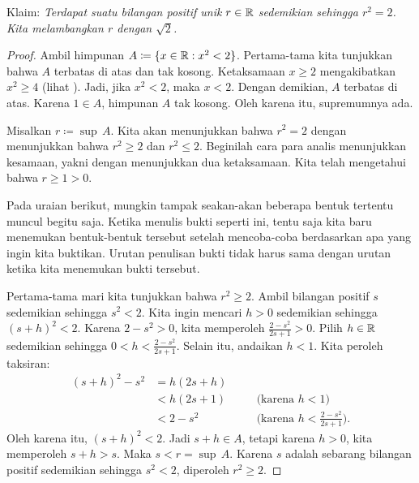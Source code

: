 \begin{example} \label{example:sqrt2}
Klaim: \emph{Terdapat suatu bilangan positif unik
$r \in {\mathbb{R}}$ sedemikian sehingga $r^2 = 2$.  Kita melambangkan $r$ dengan $\sqrt{2}$.}

\begin{proof}
Ambil himpunan
$A \coloneqq \{ x \in {\mathbb{R}} : x^2 < 2 \}$.  Pertama-tama kita tunjukkan bahwa $A$ terbatas di atas dan
tak kosong.  Ketaksamaan $x \geq 2$ mengakibatkan $x^2 \geq 4$
(lihat ).
Jadi, jika $x^2 < 2$, maka $x < 2$.  Dengan demikian, $A$ terbatas di atas.
Karena $1 \in A$, himpunan $A$ tak kosong.  Oleh karena itu, supremumnya ada.

Misalkan $r \coloneqq \sup\, A$.  Kita akan menunjukkan bahwa $r^2 = 2$ dengan menunjukkan
bahwa $r^2 \geq 2$ dan $r^2 \leq 2$.  Beginilah cara para analis menunjukkan
kesamaan, yakni dengan menunjukkan dua ketaksamaan.
Kita telah mengetahui bahwa $r \geq 1 > 0$.

Pada uraian berikut, mungkin tampak seakan-akan beberapa bentuk tertentu muncul
begitu saja.  Ketika menulis bukti seperti ini, tentu saja kita baru menemukan
bentuk-bentuk tersebut setelah mencoba-coba berdasarkan apa yang ingin kita buktikan.  Urutan
penulisan bukti tidak harus sama dengan urutan ketika kita
menemukan bukti tersebut.

Pertama-tama mari kita tunjukkan bahwa $r^2 \geq 2$.
Ambil bilangan positif $s$ sedemikian sehingga $s^2 < 2$.  Kita ingin mencari $h > 0$
sedemikian sehingga ${(s+h)}^2 < 2$.
Karena $2-s^2 > 0$, kita memperoleh $\frac{2-s^2}{2s+1} > 0$.
Pilih $h \in {\mathbb{R}}$ sedemikian sehingga
$0 < h < \frac{2-s^2}{2s+1}$.
Selain itu, andaikan $h < 1$.  Kita peroleh taksiran:
\begin{equation*}
\begin{aligned}
{(s+h)}^2 - s^2 & = h(2s + h) \\
 & < h(2s+1) & & \quad \bigl(\text{karena } h < 1\bigr) \\
 & < 2-s^2 & & \quad \bigl(\text{karena } h < \tfrac{2-s^2}{2s+1} \bigr) .
\end{aligned}
\end{equation*}
Oleh karena itu, ${(s+h)}^2 < 2$.  Jadi $s+h \in A$, tetapi karena $h > 0$,
kita memperoleh $s+h > s$.  Maka $s < r = \sup\, A$.  Karena $s$ adalah sebarang
bilangan positif sedemikian sehingga $s^2 < 2$, diperoleh $r^2 \geq 2$.



\end{proof}
\end{example}
